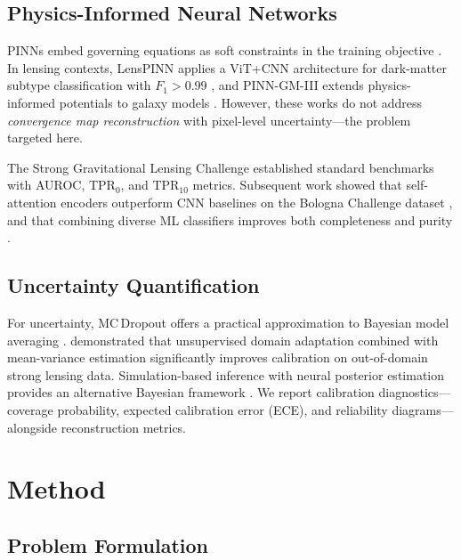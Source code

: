 \documentclass[journal]{IEEEtran}
\begin{document}
\subsection{Physics-Informed Neural Networks}

PINNs embed governing equations as soft constraints in the training
objective \citep{Raissi2019}. In lensing contexts, LensPINN applies a
ViT+CNN architecture for dark-matter subtype classification with
$F_1 > 0.99$ \citep{LensPINN2024}, and PINN-GM-III extends
physics-informed potentials to galaxy models \citep{PINNGM2025}.
However, these works do not address \emph{convergence map reconstruction}
with pixel-level uncertainty---the problem targeted here.

The Strong Gravitational Lensing Challenge \citep{Metcalf2019} established
standard benchmarks with AUROC, TPR$_0$, and TPR$_{10}$ metrics. Subsequent
work showed that self-attention encoders outperform CNN baselines on
the Bologna Challenge dataset \citep{Adam2024}, and that combining diverse
ML classifiers improves both completeness and purity \citep{Hertog2024}.

\subsection{Uncertainty Quantification}

For uncertainty, MC\,Dropout offers a practical approximation to Bayesian
model averaging \citep{GalDropout2016}. \citet{Varma2024} demonstrated that
unsupervised domain adaptation combined with mean-variance estimation
significantly improves calibration on out-of-domain strong lensing data.
Simulation-based inference with neural posterior estimation provides an
alternative Bayesian framework \citep{WagnerCarena2024}. We report
calibration diagnostics---coverage probability, expected calibration error
(ECE), and reliability diagrams---alongside reconstruction metrics.

\section{Method}
\label{sec:method}

\subsection{Problem Formulation}
\label{sec:formulation}
\end{document}
